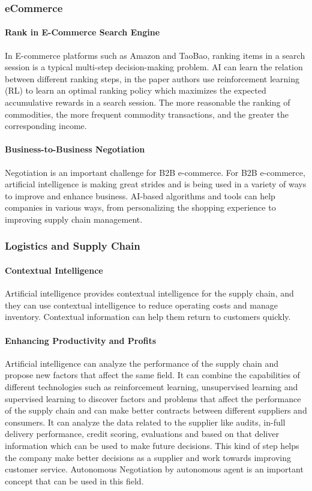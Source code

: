 \subsubsection{eCommerce}
\paragraph{Rank in E-Commerce Search Engine} In E-commerce platforms such as Amazon and TaoBao, ranking items in a search session is a typical multi-step decision-making problem. AI can learn the relation between different ranking steps, in the paper
\parencite{Hu2018} authors use reinforcement learning (RL) to learn an optimal ranking policy which maximizes the expected accumulative rewards in a search session. The more reasonable the ranking of commodities, the more frequent commodity transactions, and the greater the corresponding income.

\paragraph{Business-to-Business Negotiation} Negotiation is an important challenge for B2B e-commerce\parencite{Hans01}. For B2B e-commerce, artificial intelligence is making great strides and is being used in a variety of ways to improve and enhance business. AI-based algorithms and tools can help companies in various ways, from personalizing the shopping experience to improving supply chain management.

\subsubsection{Logistics and Supply Chain}
\paragraph{Contextual Intelligence} Artificial intelligence provides contextual intelligence for the supply chain, and they can use contextual intelligence to reduce operating costs and manage inventory. Contextual information can help them return to customers quickly.   
\paragraph{Enhancing Productivity and Profits} Artificial intelligence can analyze the performance of the supply chain and propose new factors that affect the same field. It can combine the capabilities of different technologies such as reinforcement learning, unsupervised learning and supervised learning to discover factors and problems that affect the performance of the supply chain and can make better contracts between different suppliers and consumers\parencite{Pndey2019}. It can analyze the data related to the supplier like audits, in-full delivery performance, credit scoring, evaluations and based on that deliver information which can be used to make future decisions. This kind of step helps the company make better decisions as a supplier and work towards improving customer service. Autonomous Negotiation by autonomous agent is an important concept that can be used in this field. 

